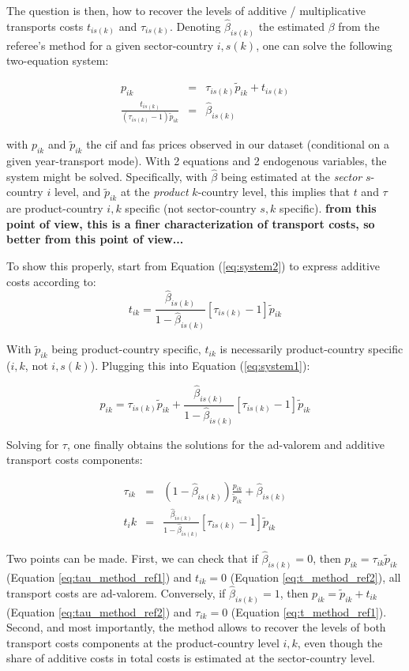 \documentclass[a4paper,12pt]{article}
\begin{document}
The question is then, how to recover the levels of additive / multiplicative transports costs $t_{is(k)}$ and $\tau_{is(k)}$. Denoting $\widehat{\beta}_{is(k)}$ the estimated $\beta$ from the referee's method for a given sector-country $i,s(k)$, one can solve the following two-equation system:

\begin{eqnarray}
p_{ik} &=& \tau_{is(k)}\widetilde{p}_{ik} +t_{is(k)} \label{eq:system1}\\
\frac{t_{is(k)}}{(\tau_{is(k)}-1)\widetilde{p}_{ik}} &=& \widehat{\beta}_{is(k)}  \label{eq:system2}
\end{eqnarray}

\noindent with $p_{ik}$ and $\widetilde{p}_{ik}$ the cif and fas prices observed in our dataset (conditional on a given year-transport mode). With 2 equations and 2 endogenous variables, the system might be solved. Specifically, with $\widehat{\beta}$ being estimated at the \textit{sector} $s$- country $i$ level, and $\widetilde{p}_{ik}$ at the \textit{product} $k$-country level, this implies that $t$ and $\tau$ are product-country $i,k$ specific (not sector-country $s,k$ specific). \textbf{from this point of view, this is a finer characterization of transport costs, so better from this point of view...}

To show this properly, start from Equation (\ref{eq:system2}) to express additive costs according to:
$$t_{ik} = \frac{ \widehat{\beta}_{is(k)}}{1- \widehat{\beta}_{is(k)}} \left[\tau_{is(k)}-1\right]\widetilde{p}_{ik} $$

With $\widetilde{p}_{ik} $ being product-country specific, $t_{ik}$ is necessarily product-country specific ($i,k$, not $i,s(k)$). Plugging this into Equation (\ref{eq:system1}):

$$p_{ik} = \tau_{is(k)} \widetilde{p}_{ik} + \frac{ \widehat{\beta}_{is(k)}}{1- \widehat{\beta}_{is(k)}} \left[\tau_{is(k)}-1\right]\widetilde{p}_{ik} $$

Solving for $\tau$, one finally obtains the solutions for the ad-valorem and additive transport costs components:

\begin{eqnarray}
\tau_{ik} & =& (1-\widehat{\beta}_{is(k)}) \frac{p_{ik}}{\widetilde{p}_{ik} } + \widehat{\beta}_{is(k)} \label{eq:tau_method_ref1}\\
t_ik &=& \frac{ \widehat{\beta}_{is(k)}}{1- \widehat{\beta}_{is(k)}} \left[\tau_{is(k)}-1\right]\widetilde{p}_{ik} \label{eq:t_method_ref1}
\end{eqnarray}


Two points can be made. First, we can check that if $\widehat{\beta}_{is(k)}=0$, then $p_{ik} = \tau_{ik} \widetilde{p}_{ik}$ (Equation \ref{eq:tau_method_ref1}) and $t_{ik} = 0$ (Equation \ref{eq:t_method_ref2}), all transport costs are ad-valorem. Conversely, if $\widehat{\beta}_{is(k)}=1$, then $p_{ik} = \widetilde{p}_{ik} + t_{ik} $ (Equation \ref{eq:tau_method_ref2}) and $\tau_{ik} = 0$ (Equation \ref{eq:t_method_ref1}). Second, and most importantly, the method allows to recover the levels of both transport costs components at the product-country level $i,k$, even though the share of additive costs in total costs is estimated at the sector-country level.
\end{document}
